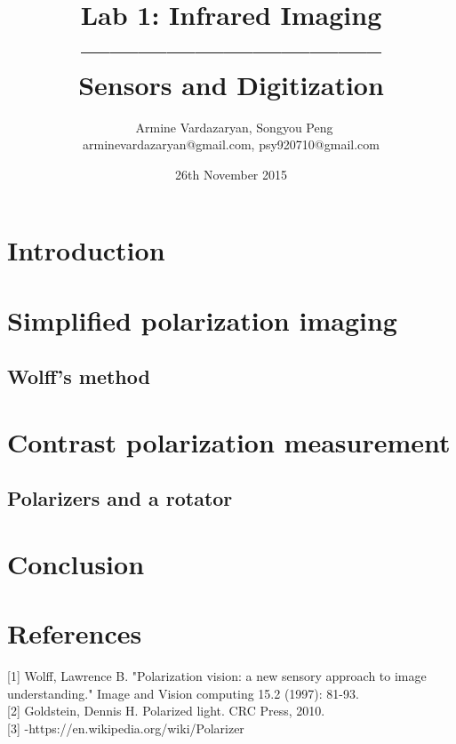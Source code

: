 \documentclass[english]{article}
\begin{document}
\title{Lab 1: Infrared Imaging\\ -------------------------------- \\ \Large Sensors and Digitization}
\author{ \ Armine Vardazaryan, Songyou Peng \\ arminevardazaryan@gmail.com, psy920710@gmail.com}
\date{26th November 2015}

\maketitle

\section{Introduction}

\section{Simplified polarization imaging}

\subsection{Wolff's method}


\section{Contrast polarization measurement}
\subsection{Polarizers and a rotator}
\section{Conclusion}

\section{References}
{[}1{]} Wolff, Lawrence B. "Polarization vision: a new sensory approach to image understanding." Image and Vision computing 15.2 (1997): 81-93.\\
{[}2{]} Goldstein, Dennis H. Polarized light. CRC Press, 2010.\\
{[}3{]} -https://en.wikipedia.org/wiki/Polarizer\\
\end{document}
